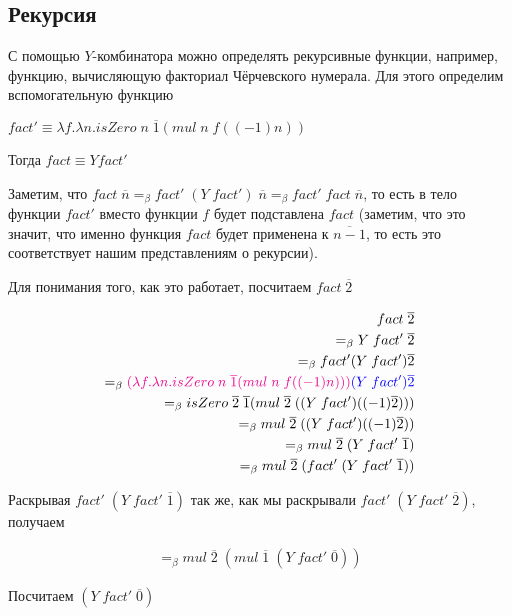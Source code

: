\subsection{Рекурсия}

С помощью $Y$-комбинатора можно определять рекурсивные функции, например, функцию, вычисляющую факториал Чёрчевского нумерала. Для этого определим вспомогательную функцию

$fact' \equiv \lambda f. \lambda n. isZero\; n \; \overline{1} (mul \; n \; f((-1) n))$

Тогда $fact \equiv Y fact'$

Заметим, что $fact \; \overline{n} =_{\beta} fact' \; (Y \; fact') \; \overline{n} =_{\beta}fact' \; fact \; \overline{n} $, то есть в тело функции $fact'$ вместо функции $f$ будет подставлена $fact$ (заметим, что это значит, что именно функция $fact$ будет применена к $\overline{n - 1}$, то есть это соответствует нашим представлениям о рекурсии).

Для понимания того, как это работает, посчитаем $fact \; \overline{2}$

\begin{align*}
	fact \; \overline{2} \\ =_{\beta} Y \; fact' \; \overline{2}\\ =_{\beta} fact' (Y \; fact') \overline{2} \\=_{\beta}\textcolor{magenta}{(\lambda f. \lambda n. isZero\; n \; \overline{1} (mul \; n \; f((-1) n)))} \textcolor{blue}{(Y \; fact') \overline{2}} \\
	=_{\beta}isZero\; \overline{2} \; \overline{1} (mul \; \overline{2} \; ((Y \; fact')((-1) \overline{2}))) \\ =_{\beta} mul \; \overline{2} \; ((Y \; fact')((-1) \overline{2})) \\ =_{\beta} mul \; \overline{2} \; (Y \; fact' \; \overline{1}) \\ =_{\beta} mul \; \overline{2} \; (fact' \;(Y \; fact' \; \overline{1}))
\end{align*}

Раскрывая $fact' \;(Y \; fact' \; \overline{1})$ так же, как мы раскрывали  $fact' \;(Y \; fact' \; \overline{2})$, получаем

\begin{align*}
	=_{\beta} mul \; \overline{2} \; (mul \; \overline{1} \; (Y \; fact' \; \overline{0}))
\end{align*}

Посчитаем $(Y \; fact' \; \overline{0})$

